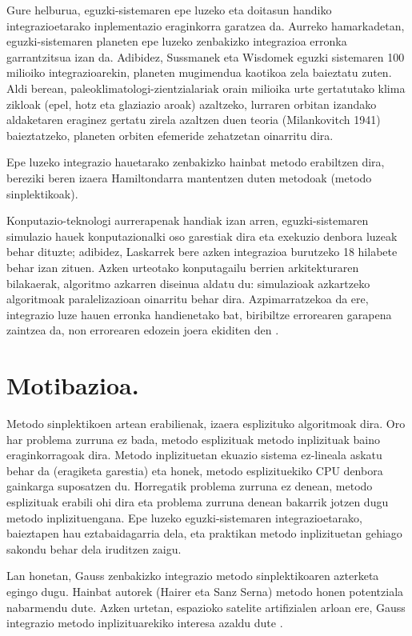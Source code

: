 Gure helburua, eguzki-sistemaren epe luzeko eta doitasun handiko integrazioetarako inplementazio eraginkorra garatzea da. Aurreko hamarkadetan, eguzki-sistemaren planeten epe luzeko zenbakizko integrazioa erronka garrantzitsua izan da. Adibidez, Sussmanek eta Wisdomek  eguzki sistemaren 100 milioiko integrazioarekin, planeten mugimendua kaotikoa zela baieztatu zuten. Aldi berean, paleoklimatologi-zientzialariak orain milioika urte gertatutako klima zikloak (epel, hotz eta glaziazio aroak) azaltzeko, lurraren orbitan izandako aldaketaren eraginez gertatu zirela azaltzen duen teoria (Milankovitch 1941) \cite{Berger2012} baieztatzeko, planeten orbiten efemeride zehatzetan oinarritu dira.        

Epe luzeko integrazio hauetarako zenbakizko hainbat metodo erabiltzen dira, bereziki beren izaera Hamiltondarra mantentzen duten metodoak (metodo sinplektikoak).

Konputazio-teknologi aurrerapenak handiak izan arren, eguzki-sistemaren simulazio hauek konputazionalki oso garestiak dira eta exekuzio denbora luzeak behar dituzte; adibidez, Laskarrek  bere azken integrazioa burutzeko 18 hilabete behar izan zituen.
Azken urteotako konputagailu berrien arkitekturaren bilakaerak, algoritmo azkarren diseinua aldatu du: simulazioak azkartzeko algoritmoak paralelizazioan oinarritu behar dira. Azpimarratzekoa da ere, integrazio luze hauen erronka handienetako bat, biribiltze errorearen garapena zaintzea da, non errorearen edozein joera ekiditen den \cite{Laskar2015}.
 

\section{Motibazioa.}
\label{intro}


Metodo sinplektikoen artean erabilienak, izaera esplizituko algoritmoak dira. Oro har problema zurruna ez bada, metodo esplizituak  metodo inplizituak baino eraginkorragoak dira. Metodo inplizituetan ekuazio sistema ez-lineala askatu behar da (eragiketa garestia) eta honek, metodo esplizituekiko CPU denbora gainkarga suposatzen du. Horregatik problema zurruna ez denean, metodo esplizituak erabili ohi dira eta problema zurruna denean bakarrik jotzen dugu metodo inplizituengana. Epe luzeko eguzki-sistemaren integrazioetarako, baieztapen hau eztabaidagarria dela, eta praktikan metodo inplizituetan gehiago sakondu behar dela iruditzen zaigu. 

Lan honetan, Gauss zenbakizko integrazio metodo sinplektikoaren azterketa egingo dugu. Hainbat autorek (Hairer \cite{Hairer2006}\cite{Hairer2008} eta Sanz Serna\cite{JMSanz-Serna1994}) metodo honen potentziala nabarmendu dute. Azken urtetan, espazioko satelite artifizialen arloan ere, Gauss integrazio metodo inplizituarekiko interesa azaldu dute \cite{Bradley2014}\cite{Beylkin2014}. 

